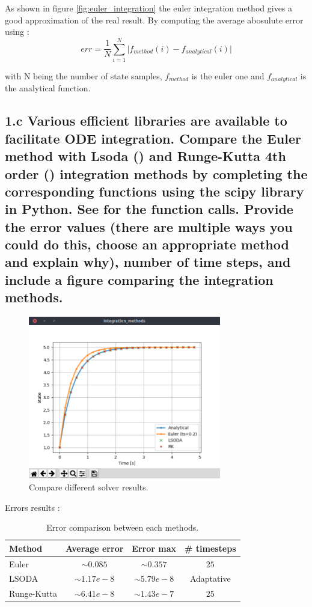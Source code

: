 \documentclass{cmc}
\begin{document}
As shown in figure \ref{fig:euler_integration} the euler integration method gives a good approximation of the real result. By computing the average abosulute error using :
$$err = \frac{1}{N} \sum_{i=1}^N \lvert f_{method}(i) - f_{analytical}(i) \rvert$$

with N being the number of state samples, $f_{method}$ is the euler one and $f_{analytical}$ is the analytical function.

\subsection*{1.c Various efficient libraries are available to facilitate ODE
  integration. Compare the Euler method with Lsoda
  () %
  and Runge-Kutta 4th order
  () %
  integration methods by completing the corresponding functions using the scipy
  library in Python. See  %
  for the function calls. Provide the error values (there are multiple ways you
  could do this, choose an appropriate method and explain why), number of time
  steps, and include a figure comparing the integration methods. }

\begin{figure}[H]
  	\centering
  	\includegraphics[width=0.75\textwidth,trim={0 1.25cm 0 0},clip]{figures/ex1_tests_solver.png}
  	\caption{Compare different solver results.}
  	\label{fig:ex1_tests_solver}
\end{figure}

Errors results :

\begin{table}[H]
\centering
\caption{Error comparison between each methods.}
	\begin{tabular}{lccc}
		\hline
		\textbf{Method} & \textbf{Average error} & \textbf{Error max} & \textbf{\# timesteps} \\ \hline \hline
		Euler & $\sim 0.085$ & $\sim 0.357$ & $25$ \\
		LSODA & $\sim 1.17 e-8$ & $\sim 5.79 e-8$ & Adaptative \\
		Runge-Kutta & $\sim 6.41 e-8$ & $\sim 1.43e-7$ & $25$ \\ \hline
	\end{tabular}
\end{table}
\end{document}
